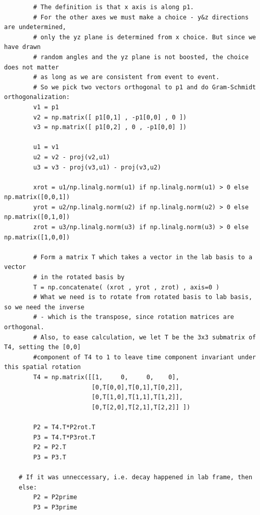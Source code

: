 \documentclass[twoside,english]{uiofysmaster}
\begin{document}
\begin{lstlisting}
		# The definition is that x axis is along p1.
		# For the other axes we must make a choice - y&z directions are undetermined,
		# only the yz plane is determined from x choice. But since we have drawn 
		# random angles and the yz plane is not boosted, the choice does not matter
		# as long as we are consistent from event to event.
		# So we pick two vectors orthogonal to p1 and do Gram-Schmidt orthogonalization:
		v1 = p1
		v2 = np.matrix([ p1[0,1] , -p1[0,0] , 0 ])
		v3 = np.matrix([ p1[0,2] , 0 , -p1[0,0] ])

		u1 = v1
		u2 = v2 - proj(v2,u1)
		u3 = v3 - proj(v3,u1) - proj(v3,u2)

		xrot = u1/np.linalg.norm(u1) if np.linalg.norm(u1) > 0 else np.matrix([0,0,1])
		yrot = u2/np.linalg.norm(u2) if np.linalg.norm(u2) > 0 else np.matrix([0,1,0])
		zrot = u3/np.linalg.norm(u3) if np.linalg.norm(u3) > 0 else np.matrix([1,0,0])

		# Form a matrix T which takes a vector in the lab basis to a vector 
		# in the rotated basis by
		T = np.concatenate( (xrot , yrot , zrot) , axis=0 )
		# What we need is to rotate from rotated basis to lab basis, so we need the inverse
		# - which is the transpose, since rotation matrices are orthogonal. 
		# Also, to ease calculation, we let T be the 3x3 submatrix of T4, setting the [0,0]
		#component of T4 to 1 to leave time component invariant under this spatial rotation
		T4 = np.matrix([[1,     0,     0,    0],
						[0,T[0,0],T[0,1],T[0,2]],
						[0,T[1,0],T[1,1],T[1,2]],
						[0,T[2,0],T[2,1],T[2,2]] ])

		P2 = T4.T*P2rot.T
		P3 = T4.T*P3rot.T
		P2 = P2.T
		P3 = P3.T

	# If it was unneccessary, i.e. decay happened in lab frame, then
	else:
		P2 = P2prime
		P3 = P3prime
\end{lstlisting}








\end{document}
